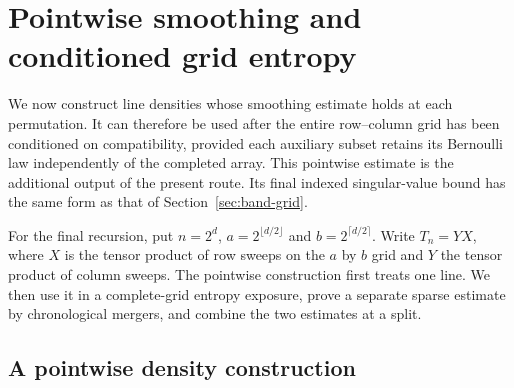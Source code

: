 \section{Pointwise smoothing and conditioned grid entropy}
\label{sec:smoothed-grid}\label{rec:sec-smoothing}

We now construct line densities whose smoothing estimate holds at each
permutation. It can therefore be used after the entire row--column grid
has been conditioned on compatibility, provided each auxiliary subset
retains its Bernoulli law independently of the completed array. This pointwise estimate
is the additional output of the present route. Its final indexed
singular-value bound has the same form as that of
Section~\ref{sec:band-grid}.

For the final recursion, put $n=2^d$,
$a=2^{\lfloor d/2\rfloor}$ and $b=2^{\lceil d/2\rceil}$.
Write $T_n=YX$, where $X$ is the tensor product of row sweeps
on the $a$ by $b$ grid and $Y$ the tensor product of column sweeps.
The pointwise construction first treats one line. We then use it in
a complete-grid entropy exposure, prove a separate sparse estimate
by chronological mergers, and combine the two estimates at a split.

\subsection{A pointwise density construction}

